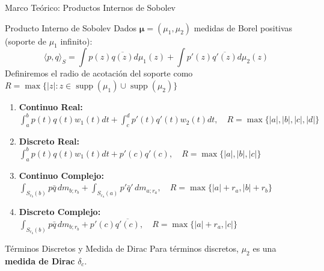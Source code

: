 \begin{frame}{Marco Teórico: Productos Internos de Sobolev}
	\footnotesize
	\begin{block}{\footnotesize Producto Interno de Sobolev \cite{escribano2025boundedness}}
		Dados $\boldsymbol{\mu}=(\mu_1, \mu_2)$ medidas de Borel positivas (soporte de $\mu_1$ infinito):\newline
		$$\langle p,q \rangle_S = \int p(z)\overline{q(z)}d\mu_1(z) + \int p'(z)\overline{q'(z)}d\mu_2(z) $$ Definiremos el radio de acotación del soporte como \scriptsize $R = \max \{ |z| : z \in \operatorname{supp}(\mu_1) \cup \operatorname{supp}(\mu_2) \}$
	\end{block}
	\begin{enumerate}
		\item \textbf{Continuo Real:} ${ \int_a^b p(t)q(t)w_1(t)dt + \int_c^d p'(t)q'(t)w_2(t)dt, \quad R = \max \{ |a|, |b|, |c|, |d| \}}$
		\item \textbf{Discreto Real:} \newline ${ \int_a^b p(t)q(t)w_1(t)dt + p'(c)q'(c),\quad R = \max \{|a|, |b|, |c|\}}$
		\item \textbf{Continuo Complejo:}
		      ${ \int_{S_{r_b}(b)} p\bar{q}\,dm_{b;r_b} + \int_{S_{r_a}(a)} p'\bar{q}'\,dm_{a;r_a}, \quad R = \max \{ |a| + r_a, |b| + r_b \}}$
		\item \textbf{Discreto Complejo:} \newline
		      ${ \int_{S_{r_b}(b)} p\bar{q}\,dm_{b;r_b} + p'(c)\overline{q'(c)},\quad R = \max \{ |a| + r_a, |c| \}}$
	\end{enumerate}
	\pause
	\begin{alertblock}{\footnotesize Términos Discretos y Medida de Dirac}
		Para términos discretos, $\mu_2$ es una \textbf{medida de Dirac} $\delta_c$.
	\end{alertblock}
\end{frame}

